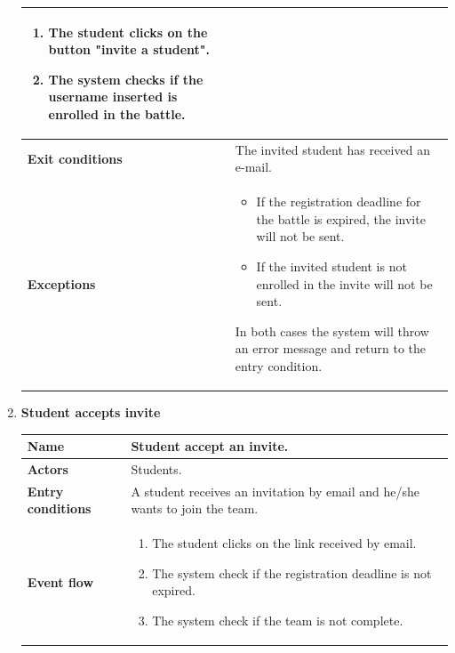 \begin{enumerate}[label=\textbf{UC.\arabic*}]
\begin{table}[H]
\begin{tabular}{|m{3.2cm}|m{9.8cm}|}
\begin{enumerate}[label=\arabic*.]
                        \item The student clicks on the button "invite a student".
                        \item The system checks if the username inserted is enrolled in the battle.
                    \end{enumerate}\\ 
                    \hline
                    \textbf{Exit conditions}  & The invited student has received an e-mail. \\
                    \hline
                    \textbf{Exceptions}  &
                    \begin{itemize}
                        \item If the registration deadline for the battle is expired, the invite will not be sent.
                        \item If the invited student is not enrolled in the invite will not be sent.
                    \end{itemize} 
                     In both cases the system will throw an error message and return to the entry condition.\\
                    \hline 
                \end{tabular}
        \end{table}
        \item {} \textbf{Student accepts invite}
        \begin{table}[H]
    	    \centering
                \renewcommand{\arraystretch}{1.5}
                \begin{tabular}{|m{3.2cm}|m{9.8cm}|}
                    \hline
                    \textbf{Name} & Student accept an invite. \\
                    \hline
                    \textbf{Actors} & Students. \\
                    \hline
                    \textbf{Entry conditions}  & A student receives an invitation by email and he/she wants to join the team. \\
                    \hline
                    \textbf{Event flow}  & 
                    \begin{enumerate}[label=\arabic*.]
                        \item The student clicks on the link received by email.
                        \item The system check if the registration deadline is not expired.
                        \item The system check if the team is not complete.

\end{enumerate}
\end{tabular}
\end{table}
\end{enumerate}
